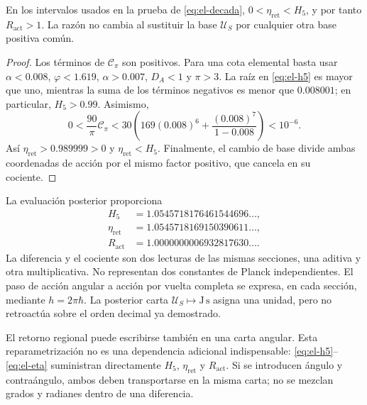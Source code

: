 \begin{proposition}
En los intervalos usados en la prueba de \eqref{eq:el-decada},
\(0<\eta_{\mathrm{ret}}<H_5\), y por tanto
\(R_{\mathrm{act}}>1\). La razón no cambia al sustituir la base
\(\mathcal U_S\) por cualquier otra base positiva común.
\end{proposition}
\begin{proof}
Los términos de \(\mathcal C_\pi\) son positivos. Para una cota
elemental basta usar \(\alpha<0.008\), \(\varphi<1.619\),
\(\alpha>0.007\), \(D_A<1\) y \(\pi>3\). La raíz en
\eqref{eq:el-h5} es mayor que uno, mientras la suma de los términos
negativos es menor que \(0.008001\); en particular, \(H_5>0.99\).
Asimismo,
\[
 0<\frac{90}{\pi}\mathcal C_\pi
 <30\left(169(0.008)^6+
           \frac{(0.008)^7}{1-0.008}\right)<10^{-6}.
\]
Así \(\eta_{\mathrm{ret}}>0.989999>0\) y
\(\eta_{\mathrm{ret}}<H_5\). Finalmente, el cambio de base divide
ambas coordenadas de acción por el mismo factor positivo, que cancela en
su cociente.
\end{proof}

La evaluación posterior proporciona
\begin{align*}
 H_5&=1.0545718176461544696\ldots,\\
 \eta_{\mathrm{ret}}&=1.0545718169150390611\ldots,\\
 R_{\mathrm{act}}&=1.0000000006932817630\ldots.
\end{align*}
La diferencia y el cociente son dos lecturas de las mismas secciones,
una aditiva y otra multiplicativa. No representan dos constantes de
Planck independientes. El paso de acción angular a acción por vuelta
completa se expresa, en cada sección, mediante
\(h=2\pi\hbar\). La posterior carta
\(\mathcal U_S\mapsto\mathrm{J\,s}\) asigna una unidad, pero no
retroactúa sobre el orden decimal ya demostrado.

El retorno regional puede escribirse también en una carta angular.
Esta reparametrización no es una dependencia adicional indispensable:
\eqref{eq:el-h5}--\eqref{eq:el-eta} suministran directamente
\(H_5\), \(\eta_{\mathrm{ret}}\) y \(R_{\mathrm{act}}\). Si se
introducen ángulo y contraángulo, ambos deben transportarse en la misma
carta; no se mezclan grados y radianes dentro de una diferencia.


